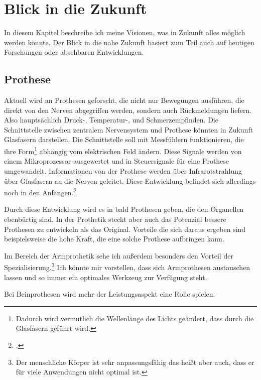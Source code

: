 \section{Blick in die Zukunft}
\label{sec:Robin:future}

In diesem Kapitel beschreibe ich meine Visionen, was in Zukunft alles möglich werden könnte. Der Blick in
die nahe Zukunft basiert zum Teil auch auf heutigen Forschungen oder absehbaren Entwicklungen.

\subsection{Prothese}
Aktuell wird an Prothesen geforscht, die nicht nur Bewegungen ausführen, die direkt von den Nerven
abgegriffen werden, sondern auch Rückmeldungen liefern. Also hauptsächlich Druck-, Temperatur-, und
Schmerzempfinden. Die Schnittstelle zwischen zentralem Nervensystem und Prothese könnten in Zukunft
Glasfasern darstellen. Die Schnittstelle soll mit Messfühlern funktionieren, die ihre
Form\footnote{Dadurch wird vermutlich die Wellenlänge des Lichts geändert, dass durch die Glasfasern
geführt wird.} abhängig vom elektrischen Feld ändern. Diese Signale werden von einem Mikroprozessor
ausgewertet und in Steuersignale für eine Prothese umgewandelt.
Informationen von der Prothese werden über Infrarotstrahlung über Glasfasern an die Nerven geleitet.
Diese Entwicklung befindet sich allerdings noch in den
Anfängen.\footcite{Spektrum:Weg_zu_intelligenten_Prothesen}

Durch diese Entwicklung wird es in bald Prothesen geben, die den Organellen ebenbürtig sind. In der
Prothetik steckt aber auch das Potenzial bessere Prothesen zu entwickeln als das Original. Vorteile
die sich daraus ergeben sind beispielsweise die hohe Kraft, die eine solche Prothese aufbringen kann.

Im Bereich der Armprothetik sehe ich außerdem besonders den Vorteil der Spezialisierung.\footnote{Der
menschliche Körper ist sehr anpassungsfähig das heißt aber auch, dass er für viele Anwendungen nicht
optimal ist.} Ich könnte mir vorstellen, dass sich Armprothesen austauschen lassen und so immer ein
optimales Werkzeug zur Verfügung steht.

Bei Beinprothesen wird mehr der Leistungsaspekt eine Rolle spielen.


